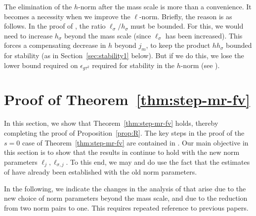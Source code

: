 \begin{rk}
The elimination of the $h$-norm after the mass scale is more than a convenience.
It becomes a necessity when we improve the $\ell$-norm.
Briefly, the reason is as follows. In the proof of
\cite[Lemma~\ref{step-lem:KKK}]{BS-rg-step}, the ratio
$\ell_{\sigma}/h_{\sigma}$
must be bounded. For this, we would need
to increase $h_{\sigma}$
beyond the mass scale  (since $\ell_{\sigma}$ has been increased).
This forces a compensating decrease in $h$
beyond $j_m$, to keep the product $hh_{\sigma}$ bounded for stability
(as in Section~\ref{sec:stability1}
below). But if we do this, we lose the lower bound required on $\epsilon_{g\tau^2}$
required for stability in the $h$-norm (see \cite[\eqref{IE-e:epVbardefz-app}]{BS-rg-IE}).
\end{rk}


\section{Proof of Theorem~\ref{thm:step-mr-fv}}
\label{sec:Rpf2}

In this section, we show that Theorem~\ref{thm:step-mr-fv}
holds, thereby completing the proof of Proposition~\ref{prop:R}.
The key steps in
the proof of the $s = 0$ case of Theorem~\ref{thm:step-mr-fv}
are contained in \cite{BS-rg-IE,BS-rg-step}.
Our main objective in this section is to show that the results in \cite{BS-rg-IE,BS-rg-step}
continue to hold with the new norm parameters $\ell_j,\ell_{\sigma,j}$.
To this end, we may and do use the fact that the estimates of \cite{BS-rg-IE} have already been
established with the old norm parameters.

In the following,
we indicate the changes in the analysis of
\cite{BS-rg-IE,BS-rg-step} that arise due to the new choice of norm parameters 
beyond the mass scale, and due to the reduction from two norm pairs to one.
This requires repeated reference to previous papers.

